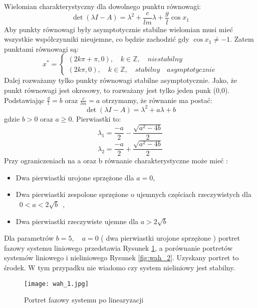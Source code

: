 \documentclass[a4paper,11pt]{article}
\begin{document}
Wielomian charakterystyczny dla dowolnego punktu równowagi:
\begin{equation*}
\det{(\lambda I-A)}=\lambda^{2}+\frac{c}{lm}\lambda+\frac{g}{l}\cos x_{1}
\end{equation*}
Aby punkty równowagi były asymptotycznie stabilne wielomian musi mieć wszystkie współczynniki nieujemne, co będzie zachodzić gdy \(\cos x_{1} \neq -1 \). Zatem punktami równowagi są:
\begin{equation*}
x^{*}=
\begin{cases}
(2k\pi+\pi,0), \quad k\in\mathbb{Z}, \quad niestabilny \\
(2k\pi,0), \quad k\in\mathbb{Z}, \quad stabilny \quad asymptotycznie
\end{cases} 
\end{equation*}
Dalej rozważamy tylko punkty równowagi stabilne asymptotycznie. Jako, że punkt równowagi jest okresowy, to rozważany jest tylko jeden punk (0,0).
Podstawiając \(\frac{g}{l}=b\) oraz \(\frac{c}{lm}=a\) otrzymamy, że równanie ma postać:
\begin{equation*}
\det{(\lambda I-A)}=\lambda^{2}+a\lambda+b
\end{equation*}
gdzie \(b>0\) oraz \(a\geqslant0\). Pierwiastki to: 
\begin{equation*}
\lambda_{1}=\frac{-a}{2}-\frac{\sqrt{a^{2}-4b}}{2}
\end{equation*}
\begin{equation*}
\lambda_{2}=\frac{-a}{2}+\frac{\sqrt{a^{2}-4b}}{2}
\end{equation*}
Przy ograniczeniach na a oraz b równanie charakterystyczne może mieć :\\
\begin{itemize}
\item Dwa pierwiastki urojone sprzężone dla \(a=0\),
\item Dwa pierwiastki zespolone sprzężone o ujemnych częściach rzeczywistych dla \mbox{ \(0<a<2\sqrt{b}\) },
\item Dwa pierwiastki rzeczywiste ujemne dla \(a>2\sqrt{b}\)
\end{itemize}
Dla parametrów \(b=5,\quad a=0\) ( dwa pierwiastki urojone sprzężone ) portret fazowy systemu liniowego przedstawia Rysunek \ref{fig:wah_1}, a porównanie portretów systemów liniowego i nieliniowego Rysunek \ref{fig:wah_2}. Uzyskany portret to środek. W tym przypadku nie wiadomo czy system nieliniowy jest stabilny.
\begin{figure}[H]
\centerline{\texttt{[image: wah\_1.jpg]}}
\centering
\caption{Portret fazowy systemu po linearyzacji}
\label{fig:wah_1}
\end{figure}
\end{document}
